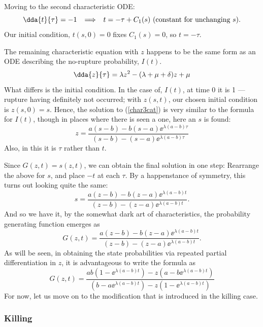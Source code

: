 \noindent
Moving to the second characteristic ODE:
$$\dda{t}{\tau} = -1 \hspace{5pt} \implies \hspace{5pt} t = -\tau +  C_1(s) \text{  (constant for unchanging }s ).$$
Our initial condition, $t(s,0) = 0$ fixes $C_1(s) = 0$, so $t = -\tau$.\par
The remaining characteristic equation with $z$ happens to be the same form as an ODE describing the no-rupture probability, $I(t)$. 
\begin{equation}
\label{char3cat}
\dda{z}{\tau} = \lambda z^2 - (\lambda + \mu + \delta)z + \mu
\end{equation}
What differs is the initial condition. In the case of, $I(t)$, at time 0 it is 1 --- rupture having definitely not occurred; with $z(s,t)$, our chosen initial condition is $z(s, 0) = s$. Hence, the solution to (\ref{char3cat}) is very similar to the formula for $I(t)$, though in places where there is seen a one, here an $s$ is found:
\begin{equation*}
z = \frac{a(s-b) - b(s-a)\ee^{\lambda(a-b) \tau} } {(s-b) - (s-a)\ee^{\lambda(a-b) \tau}}
\end{equation*}
Also, in this it is $\tau$ rather than $t$.\par
Since $G(z, t) = s(z, t)$, we can obtain the final solution in one step: Rearrange the above for $s$, and place $-t$ at each $\tau$. By a happenstance of symmetry, this turns out looking quite the same:
\begin{equation}
\label{s2343}
s = \frac{a(z-b) - b(z-a)\ee^{\lambda(a-b) t} } {(z-b) - (z-a)\ee^{\lambda(a-b) t}}.
\end{equation}
And so we have it, by the somewhat dark art of characteristics, the probability generating function emerges as
\begin{equation*}
G(z,t) = \frac{a(z-b) - b(z-a)\ee^{\lambda(a-b) t} } {(z-b) - (z-a)\ee^{\lambda(a-b) t}}.
\end{equation*}
As will be seen, in obtaining the state probabilities via repeated partial differentiation in $z$, it is advantageous to write the formula as
\begin{equation*}
G(z,t) = \frac{ab(1-\ee^{\lambda(a-b) t}) - z(a-b\ee^{\lambda(a-b) t}) } {  (b-a\ee^{\lambda(a-b) t}) -z(1-\ee^{\lambda(a-b) t})  }
\end{equation*}
For now, let us move on to the modification that is introduced in the killing case. 


\subsubsection*{Killing}

